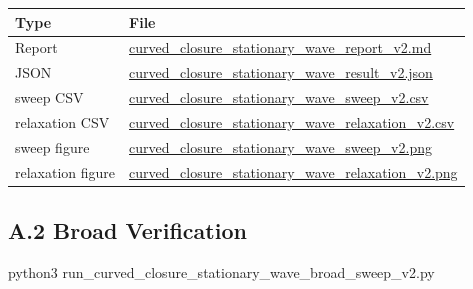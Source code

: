 \documentclass[
  a4paper,
]{article}
\newenvironment{Shaded}{}{}
\newcommand{\NormalTok}[1]{#1}
\newcounter{none} %
\begin{document}
{\def\LTcaptype{none} %
\begin{longtable}[]{@{}
  >{\raggedright\arraybackslash}p{}
  >{\raggedright\arraybackslash}p{}@{}}
\toprule\noalign{}
\begin{minipage}[b]{\linewidth}\raggedright
Type
\end{minipage} & \begin{minipage}[b]{\linewidth}\raggedright
File
\end{minipage} \\
\midrule\noalign{}
\endhead
\bottomrule\noalign{}
\endlastfoot
Report &
\href{curved_closure_stationary_wave_result_v2/curved_closure_stationary_wave_report_v2.md}{curved\_closure\_stationary\_wave\_report\_v2.md} \\
JSON &
\href{curved_closure_stationary_wave_result_v2/curved_closure_stationary_wave_result_v2.json}{curved\_closure\_stationary\_wave\_result\_v2.json} \\
sweep CSV &
\href{curved_closure_stationary_wave_result_v2/curved_closure_stationary_wave_sweep_v2.csv}{curved\_closure\_stationary\_wave\_sweep\_v2.csv} \\
relaxation CSV &
\href{curved_closure_stationary_wave_result_v2/curved_closure_stationary_wave_relaxation_v2.csv}{curved\_closure\_stationary\_wave\_relaxation\_v2.csv} \\
sweep figure &
\href{curved_closure_stationary_wave_result_v2/curved_closure_stationary_wave_sweep_v2.png}{curved\_closure\_stationary\_wave\_sweep\_v2.png} \\
relaxation figure &
\href{curved_closure_stationary_wave_result_v2/curved_closure_stationary_wave_relaxation_v2.png}{curved\_closure\_stationary\_wave\_relaxation\_v2.png} \\
\end{longtable}
}

\subsection{A.2 Broad Verification}\label{a.2-broad-verification}

\begin{Shaded}
\begin{Highlighting}[]
\NormalTok{python3 run\_curved\_closure\_stationary\_wave\_broad\_sweep\_v2.py}
\end{Highlighting}
\end{Shaded}
\end{document}
